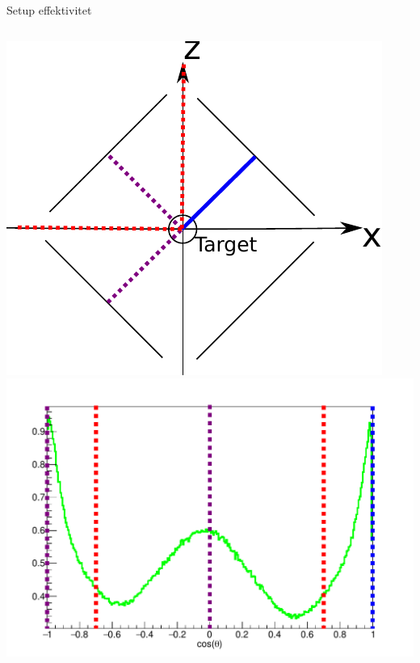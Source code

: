 \begin{frame}{Setup effektivitet}
\begin{columns}
\begin{overprint}
			\includegraphics[width=\columnwidth]{../figures/showAngles/opstilling_show_angles_3.pdf}
			\includegraphics[width=\columnwidth]{../figures/showAngles/data_3.pdf}
		\end{overprint}
	\end{columns}
\end{frame}


